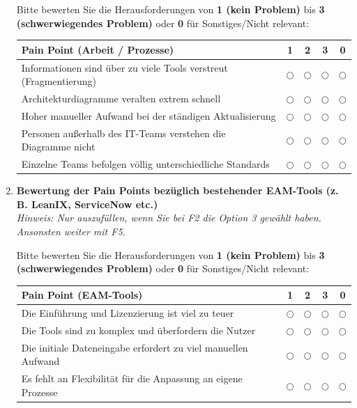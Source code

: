 \documentclass[11pt,a4paper]{article}
\begin{document}
\begin{enumerate}[label=\textbf{F\arabic*.}, leftmargin=*, itemsep=0.2cm]
    \noindent Bitte bewerten Sie die Herausforderungen von \textbf{1 (kein Problem)} bis \textbf{3 (schwerwiegendes Problem)} oder \textbf{0} für Sonstiges/Nicht relevant:
    \\[0.1cm]
    \begin{tabular}{p{9.8cm}cccc}
        \toprule
        \textbf{Pain Point (Arbeit / Prozesse)} & \textbf{1} & \textbf{2} & \textbf{3} & \textbf{0} \\
        \midrule
        Informationen sind über zu viele Tools verstreut (Fragmentierung) & $\bigcirc$ & $\bigcirc$ & $\bigcirc$ & $\bigcirc$ \\
        Architekturdiagramme veralten extrem schnell & $\bigcirc$ & $\bigcirc$ & $\bigcirc$ & $\bigcirc$ \\
        Hoher manueller Aufwand bei der ständigen Aktualisierung & $\bigcirc$ & $\bigcirc$ & $\bigcirc$ & $\bigcirc$ \\
        Personen außerhalb des IT-Teams verstehen die Diagramme nicht & $\bigcirc$ & $\bigcirc$ & $\bigcirc$ & $\bigcirc$ \\
        Einzelne Teams befolgen völlig unterschiedliche Standards & $\bigcirc$ & $\bigcirc$ & $\bigcirc$ & $\bigcirc$ \\
        \bottomrule
    \end{tabular}

    \newpage 

    \item \textbf{Bewertung der Pain Points bezüglich bestehender EAM-Tools (z. B. LeanIX, ServiceNow etc.)} \\
    {\small\textit{Hinweis: Nur auszufüllen, wenn Sie bei F2 die Option 3 gewählt haben. Ansonsten weiter mit F5.}}
    
    \noindent Bitte bewerten Sie die Herausforderungen von \textbf{1 (kein Problem)} bis \textbf{3 (schwerwiegendes Problem)} oder \textbf{0} für Sonstiges/Nicht relevant:
    \\[0.1cm]
    \begin{tabular}{p{9.8cm}cccc}
        \toprule
        \textbf{Pain Point (EAM-Tools)} & \textbf{1} & \textbf{2} & \textbf{3} & \textbf{0} \\
        \midrule
        Die Einführung und Lizenzierung ist viel zu teuer & $\bigcirc$ & $\bigcirc$ & $\bigcirc$ & $\bigcirc$ \\
        Die Tools sind zu komplex und überfordern die Nutzer & $\bigcirc$ & $\bigcirc$ & $\bigcirc$ & $\bigcirc$ \\
        Die initiale Dateneingabe erfordert zu viel manuellen Aufwand & $\bigcirc$ & $\bigcirc$ & $\bigcirc$ & $\bigcirc$ \\
        Es fehlt an Flexibilität für die Anpassung an eigene Prozesse & $\bigcirc$ & $\bigcirc$ & $\bigcirc$ & $\bigcirc$ \\
        \bottomrule
    \end{tabular}


\end{enumerate}
\end{document}
